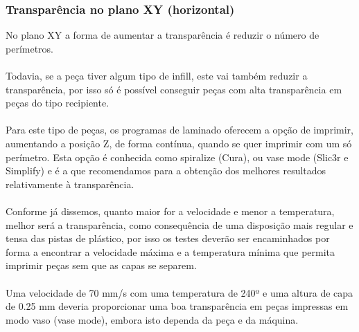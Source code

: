 \documentclass[11pt,a4paper]{article}
\begin{document}
		\subsubsection{Transparência no plano XY (horizontal)}No plano XY a forma de aumentar a transparência é reduzir o número de perímetros.
\\\\
Todavia, se a peça tiver algum tipo de infill, este vai também reduzir a transparência, por isso só é possível conseguir peças com alta transparência em peças do tipo recipiente.
\\\\
Para este tipo de peças, os programas de laminado oferecem a opção de imprimir, aumentando a posição Z, de forma contínua, quando se quer imprimir com um só perímetro. Esta opção é conhecida como spiralize (Cura), ou vase mode (Slic3r e Simplify) e é a que recomendamos para a obtenção dos melhores resultados relativamente à transparência.
\\\\
Conforme já dissemos, quanto maior for a velocidade e menor a temperatura, melhor será a transparência, como consequência de uma disposição mais regular e tensa das pistas de plástico, por isso os testes deverão ser encaminhados por forma a encontrar a velocidade máxima e a temperatura mínima que permita imprimir peças sem que as capas se separem.
\\\\
Uma velocidade de 70 mm/s com uma temperatura de 240º e uma altura de capa de 0.25 mm deveria proporcionar uma boa transparência em peças impressas em modo vaso (vase mode), embora isto dependa da peça e da máquina.
\end{document}
